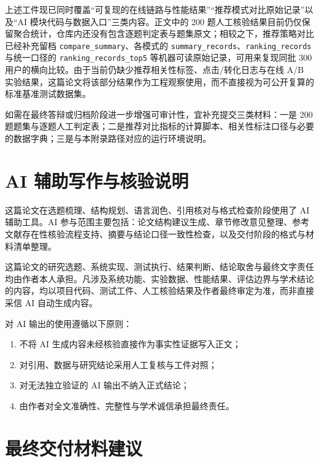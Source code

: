 上述工件现已同时覆盖“可复现的在线链路与性能结果”“推荐模式对比原始记录”以及“AI 模块代码与数据入口”三类内容。正文中的 200 题人工核验结果目前仍仅保留聚合统计，仓库内还没有包含逐题判定表与题集原文；相较之下，推荐策略对比已经补充留档 \texttt{compare\_summary}、各模式的 \texttt{summary\_records}、\texttt{ranking\_records} 与统一口径的 \texttt{ranking\_records\_top5} 等机器可读原始记录，可用来复现同批 300 用户的横向比较。由于当前仍缺少推荐相关性标签、点击/转化日志与在线 A/B 实验结果，这篇论文将该部分结果作为工程观察使用，而不直接视为可公开复算的标准基准测试数据集。

如需在最终答辩或归档阶段进一步增强可审计性，宜补充提交三类材料：一是 200 题题集与逐题人工判定表；二是推荐对比指标的计算脚本、相关性标注口径与必要的数据字典；三是与本附录路径对应的运行环境说明。

\chapter{AI 辅助写作与核验说明}

这篇论文在选题梳理、结构规划、语言润色、引用核对与格式检查阶段使用了 AI 辅助工具。AI 参与范围主要包括：论文结构建议生成、章节修改意见整理、参考文献存在性核验流程支持、摘要与结论口径一致性检查，以及交付阶段的格式与材料清单整理。

这篇论文的研究选题、系统实现、测试执行、结果判断、结论取舍与最终文字责任均由作者本人承担。凡涉及系统功能、实验数据、性能结果、评估边界与学术结论的内容，均以项目代码、测试工件、人工核验结果及作者最终审定为准，而非直接采信 AI 自动生成内容。

对 AI 输出的使用遵循以下原则：
\begin{enumerate}
  \item 不将 AI 生成内容未经核验直接作为事实性证据写入正文；
  \item 对引用、数据与研究结论采用人工复核与工件对照；
  \item 对无法独立验证的 AI 输出不纳入正式结论；
  \item 由作者对全文准确性、完整性与学术诚信承担最终责任。
\end{enumerate}

\chapter{最终交付材料建议}

